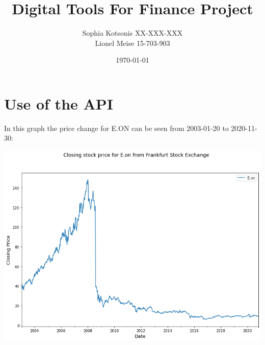 \documentclass[11pt,a4paper,openany,oneside]{article}%
\begin{document}
\title{Digital Tools For Finance Project}
\author{Sophia Kotsonis XX-XXX-XXX\\
Lionel Meise 15-703-903}
\date{\today}
\maketitle
\newpage

\section{Use of the API}
In this graph the price change for E.ON can be seen from 2003-01-20 to 2020-11-30:\newline
\begin{center}
\includegraphics[scale=0.5]{Stock_Eon.png}
\end{center}


\newpage
\end{document}
